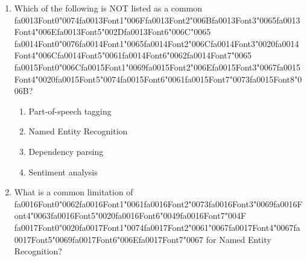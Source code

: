 \documentclass[12pt]{article}
\begin{document}
\begin{enumerate}[label=Q\arabic*.]
\begin{enumerate}[label=(\Alph*)]
    \item It produces too many tokens
    \item It does not work well for languages without explicit word boundaries
    \item It cannot tokenize English at all
    \item It ignores punctuation entirely
\end{enumerate}
\item Which of the following is NOT listed as a common {\csname fa0013Font0\endcsname\char"0074}{\csname fa0013Font1\endcsname\char"006F}{\csname fa0013Font2\endcsname\char"006B}{\csname fa0013Font3\endcsname\char"0065}{\csname fa0013Font4\endcsname\char"006E}{\csname fa0013Font5\endcsname\char"002D}{\csname fa0013Font6\endcsname\char"006C}{\char"0065} {\csname fa0014Font0\endcsname\char"0076}{\csname fa0014Font1\endcsname\char"0065}{\csname fa0014Font2\endcsname\char"006C}{\csname fa0014Font3\endcsname\char"0020}{\csname fa0014Font4\endcsname\char"006C}{\csname fa0014Font5\endcsname\char"0061}{\csname fa0014Font6\endcsname\char"0062}{\csname fa0014Font7\endcsname\char"0065} {\csname fa0015Font0\endcsname\char"006C}{\csname fa0015Font1\endcsname\char"0069}{\csname fa0015Font2\endcsname\char"006E}{\csname fa0015Font3\endcsname\char"0067}{\csname fa0015Font4\endcsname\char"0020}{\csname fa0015Font5\endcsname\char"0074}{\csname fa0015Font6\endcsname\char"0061}{\csname fa0015Font7\endcsname\char"0073}{\csname fa0015Font8\endcsname\char"006B}?
\begin{enumerate}[label=(\Alph*)]
    \item Part-of-speech tagging
    \item Named Entity Recognition
    \item Dependency parsing
    \item Sentiment analysis
\end{enumerate}
\item What is a common limitation of {\csname fa0016Font0\endcsname\char"0062}{\csname fa0016Font1\endcsname\char"0061}{\csname fa0016Font2\endcsname\char"0073}{\csname fa0016Font3\endcsname\char"0069}{\csname fa0016Font4\endcsname\char"0063}{\csname fa0016Font5\endcsname\char"0020}{\csname fa0016Font6\endcsname\char"0049}{\csname fa0016Font7\endcsname\char"004F} {\csname fa0017Font0\endcsname\char"0020}{\csname fa0017Font1\endcsname\char"0074}{\csname fa0017Font2\endcsname\char"0061}{\char"0067}{\csname fa0017Font4\endcsname\char"0067}{\csname fa0017Font5\endcsname\char"0069}{\csname fa0017Font6\endcsname\char"006E}{\csname fa0017Font7\endcsname\char"0067} for Named Entity Recognition?

\end{enumerate}
\end{document}
